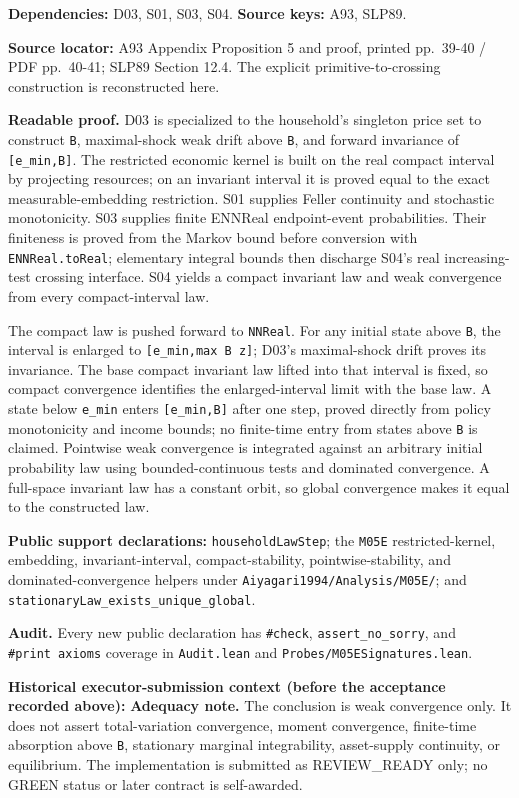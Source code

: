 \documentclass[
  11pt,
]{article}
\let\LedgerOriginalTexttt\texttt
\renewcommand{\texttt}[1]{{\small\LedgerOriginalTexttt{#1}}}
\begin{document}
\textbf{Dependencies:} D03, S01, S03, S04. \textbf{Source keys:} A93,
SLP89.

\textbf{Source locator:} A93 Appendix Proposition 5 and proof, printed
pp.~39-40 / PDF pp.~40-41; SLP89 Section 12.4. The explicit
primitive-to-crossing construction is reconstructed here.

\textbf{Readable proof.} D03 is specialized to the household's singleton
price set to construct \texttt{B}, maximal-shock weak drift above
\texttt{B}, and forward invariance of \texttt{{[}e\_min,B{]}}. The
restricted economic kernel is built on the real compact interval by
projecting resources; on an invariant interval it is proved equal to the
exact measurable-embedding restriction. S01 supplies Feller continuity
and stochastic monotonicity. S03 supplies finite ENNReal endpoint-event
probabilities. Their finiteness is proved from the Markov bound before
conversion with \texttt{ENNReal.toReal}; elementary integral bounds then
discharge S04's real increasing-test crossing interface. S04 yields a
compact invariant law and weak convergence from every compact-interval
law.

The compact law is pushed forward to \texttt{NNReal}. For any initial
state above \texttt{B}, the interval is enlarged to
\texttt{{[}e\_min,max\ B\ z{]}}; D03's maximal-shock drift proves its
invariance. The base compact invariant law lifted into that interval is
fixed, so compact convergence identifies the enlarged-interval limit
with the base law. A state below \texttt{e\_min} enters
\texttt{{[}e\_min,B{]}} after one step, proved directly from policy
monotonicity and income bounds; no finite-time entry from states above
\texttt{B} is claimed. Pointwise weak convergence is integrated against
an arbitrary initial probability law using bounded-continuous tests and
dominated convergence. A full-space invariant law has a constant orbit,
so global convergence makes it equal to the constructed law.

\textbf{Public support declarations:} \texttt{householdLawStep}; the
\texttt{M05E} restricted-kernel, embedding, invariant-interval,
compact-stability, pointwise-stability, and dominated-convergence
helpers under \texttt{Aiyagari1994/Analysis/M05E/}; and
\texttt{stationaryLaw\_exists\_unique\_global}.

\textbf{Audit.} Every new public declaration has \texttt{\#check},
\texttt{assert\_no\_sorry}, and \texttt{\#print\ axioms} coverage in
\texttt{Audit.lean} and \texttt{Probes/M05ESignatures.lean}.

\textbf{Historical executor-submission context (before the acceptance
recorded above):} \textbf{Adequacy note.} The conclusion is weak
convergence only. It does not assert total-variation convergence, moment
convergence, finite-time absorption above \texttt{B}, stationary
marginal integrability, asset-supply continuity, or equilibrium. The
implementation is submitted as REVIEW\_READY only; no GREEN status or
later contract is self-awarded.
\end{document}
